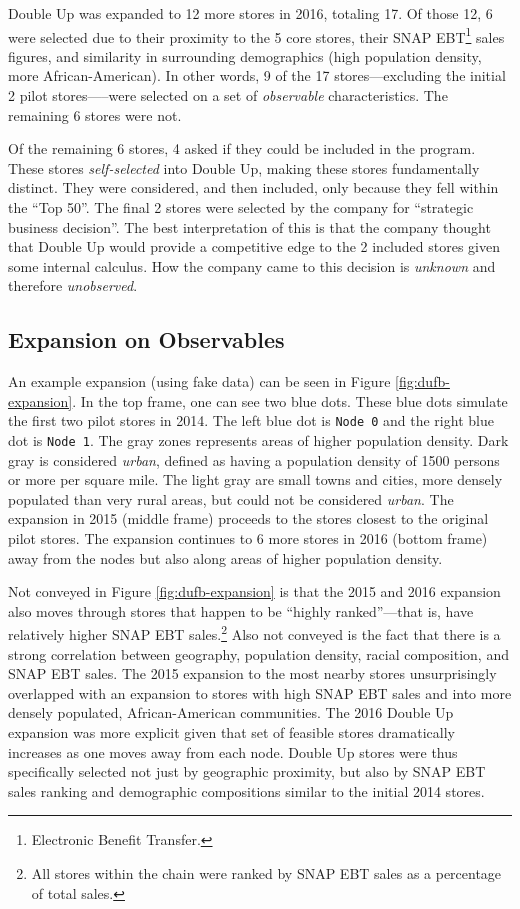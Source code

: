 \documentclass[11pt,letterpaperpaper,]{book}
\let\rmarkdownfootnote\footnote%
\def\footnote{\protect\rmarkdownfootnote}
\begin{document}
Double Up was expanded to 12 more stores in 2016, totaling 17. Of those
12, 6 were selected due to their proximity to the 5 core stores, their
SNAP EBT\footnote{Electronic Benefit Transfer.} sales figures, and
similarity in surrounding demographics (high population density, more
African-American). In other words, 9 of the 17 stores---excluding the
initial 2 pilot stores-----were selected on a set of \emph{observable}
characteristics. The remaining 6 stores were not.

Of the remaining 6 stores, 4 asked if they could be included in the
program. These stores \emph{self-selected} into Double Up, making these
stores fundamentally distinct. They were considered, and then included,
only because they fell within the ``Top 50''. The final 2 stores were
selected by the company for ``strategic business decision''. The best
interpretation of this is that the company thought that Double Up would
provide a competitive edge to the 2 included stores given some internal
calculus. How the company came to this decision is \emph{unknown} and
therefore \emph{unobserved}.

\subsection*{Expansion on Observables}\label{expansion-on-observables}

An example expansion (using fake data) can be seen in Figure
\ref{fig:dufb-expansion}. In the top frame, one can see two blue dots.
These blue dots simulate the first two pilot stores in 2014. The left
blue dot is \texttt{Node\ 0} and the right blue dot is \texttt{Node\ 1}.
The gray zones represents areas of higher population density. Dark gray
is considered \emph{urban}, defined as having a population density of
1500 persons or more per square mile. The light gray are small towns and
cities, more densely populated than very rural areas, but could not be
considered \emph{urban}. The expansion in 2015 (middle frame) proceeds
to the stores closest to the original pilot stores. The expansion
continues to 6 more stores in 2016 (bottom frame) away from the nodes
but also along areas of higher population density.

Not conveyed in Figure \ref{fig:dufb-expansion} is that the 2015 and
2016 expansion also moves through stores that happen to be ``highly
ranked''---that is, have relatively higher SNAP EBT sales.\footnote{All
  stores within the chain were ranked by SNAP EBT sales as a percentage
  of total sales.} Also not conveyed is the fact that there is a strong
correlation between geography, population density, racial composition,
and SNAP EBT sales. The 2015 expansion to the most nearby stores
unsurprisingly overlapped with an expansion to stores with high SNAP EBT
sales and into more densely populated, African-American communities. The
2016 Double Up expansion was more explicit given that set of feasible
stores dramatically increases as one moves away from each node. Double
Up stores were thus specifically selected not just by geographic
proximity, but also by SNAP EBT sales ranking and demographic
compositions similar to the initial 2014 stores.
\end{document}

